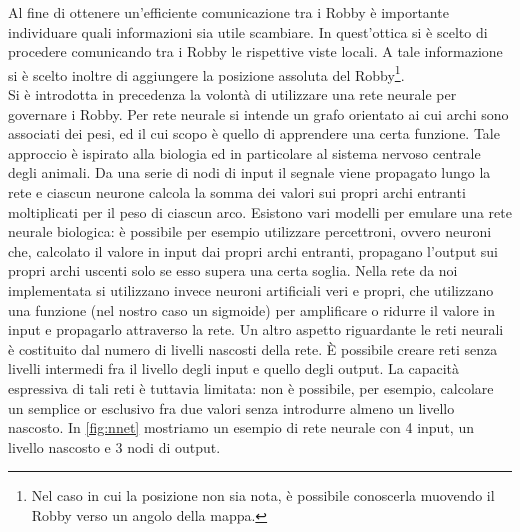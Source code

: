 Al fine di ottenere un'efficiente comunicazione tra i Robby è importante
individuare quali informazioni sia utile scambiare. In quest'ottica si è scelto
di procedere comunicando tra i Robby le rispettive viste locali. A tale
informazione si è scelto inoltre di aggiungere la posizione assoluta del
Robby\footnote{Nel caso in cui la posizione non sia nota, è possibile conoscerla
muovendo il Robby verso un angolo della mappa.}.\\



Si è introdotta in precedenza la volontà di utilizzare una rete neurale per
governare i Robby. Per rete neurale si intende un grafo orientato ai cui archi 
sono associati dei pesi, ed il cui scopo è quello di apprendere una certa 
funzione. Tale approccio è ispirato alla biologia ed in particolare al sistema 
nervoso centrale degli animali. Da una serie di nodi di input il segnale viene 
propagato lungo la rete e ciascun neurone calcola la somma dei valori sui 
propri archi entranti moltiplicati per il peso di ciascun arco. Esistono vari 
modelli per emulare una rete neurale biologica: è possibile per esempio 
utilizzare percettroni, ovvero neuroni che, calcolato il valore in input dai 
propri archi entranti, propagano l'output sui propri archi uscenti solo se esso 
supera una certa soglia. Nella rete da noi implementata si utilizzano invece 
neuroni artificiali veri e propri, che utilizzano una funzione (nel nostro caso 
un sigmoide) per amplificare o ridurre il valore in input e propagarlo 
attraverso la rete. Un altro aspetto riguardante le reti neurali è costituito 
dal 
numero di livelli nascosti della rete. È possibile creare reti senza livelli 
intermedi fra il livello degli input e quello degli output. La capacità 
espressiva di tali reti è tuttavia limitata: non è possibile, per esempio, 
calcolare un semplice or esclusivo fra due valori senza introdurre almeno un 
livello 
nascosto\cite{norvigrusselai}. In \cref{fig:nnet} mostriamo un esempio di rete 
neurale con 4 input, un livello nascosto e 3 nodi di output.
\\




